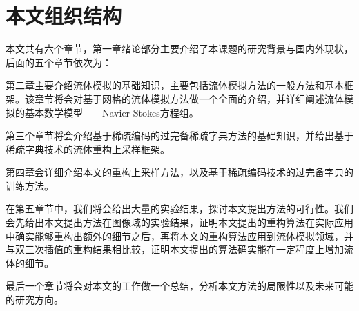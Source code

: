 \section{本文组织结构}
\label{sec:orgnization}

本文共有六个章节，第一章绪论部分主要介绍了本课题的研究背景与国内外现状，后面的五个章节依次为：

第二章主要介绍流体模拟的基础知识，主要包括流体模拟方法的一般方法和基本框架。该章节将会对基于网格的流体模拟方法做一个全面的介绍，并详细阐述流体模拟的基本数学模型——Navier-Stokes方程组。

第三个章节将会介绍基于稀疏编码的过完备稀疏字典方法的基础知识，并给出基于稀疏字典技术的流体重构上采样框架。

第四章会详细介绍本文的重构上采样方法，以及基于稀疏编码技术的过完备字典的训练方法。

在第五章节中，我们将会给出大量的实验结果，探讨本文提出方法的可行性。我们会先给出本文提出方法在图像域的实验结果，证明本文提出的重构算法在实际应用中确实能够重构出额外的细节之后，再将本文的重构算法应用到流体模拟领域，并与双三次插值的重构结果相比较，证明本文提出的算法确实能在一定程度上增加流体的细节。

最后一个章节将会对本文的工作做一个总结，分析本文方法的局限性以及未来可能的研究方向。

